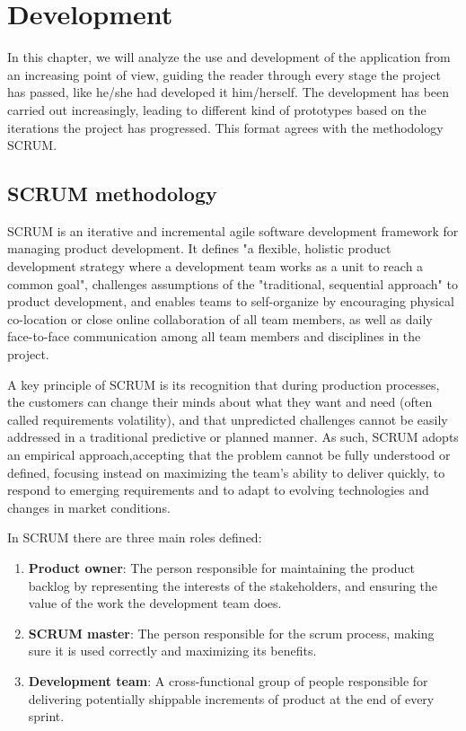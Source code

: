 \documentclass[a4paper, 12pt]{book}
\begin{document}

\chapter{Development}

In this chapter, we will analyze the use and development of the application from an increasing point of view, guiding the reader through every stage the project has passed, like he/she had developed it him/herself. The development has been carried out increasingly, leading to different kind of prototypes based on the iterations the project has progressed. This format agrees with the methodology SCRUM.

\section{SCRUM methodology}
SCRUM is an iterative and incremental agile software development framework for managing product development. It defines "a flexible, holistic product development strategy where a development team works as a unit to reach a common goal", challenges assumptions of the "traditional, sequential approach" to product development, and enables teams to self-organize by encouraging physical co-location or close online collaboration of all team members, as well as daily face-to-face communication among all team members and disciplines in the project.

A key principle of SCRUM is its recognition that during production processes, the customers can change their minds about what they want and need (often called requirements volatility), and that unpredicted challenges cannot be easily addressed in a traditional predictive or planned manner. As such, SCRUM adopts an empirical approach,accepting that the problem cannot be fully understood or defined, focusing instead on maximizing the team's ability to deliver quickly, to respond to emerging requirements and to adapt to evolving technologies and changes in market conditions.

In SCRUM there are three main roles defined:	

\begin{enumerate}
\item \textbf{Product owner}: The person responsible for maintaining the product backlog by representing the interests of the stakeholders, and ensuring the value of the work the development team does.
\item \textbf{SCRUM master}: The person responsible for the scrum process, making sure it is used correctly and maximizing its benefits.
\item \textbf{Development team}: A cross-functional group of people responsible for delivering potentially shippable increments of product at the end of every sprint.
\end{enumerate}
\end{document}
